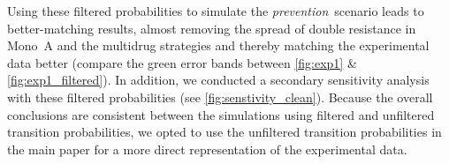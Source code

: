 Using these filtered probabilities to simulate the \textit{prevention}~scenario leads to better-matching results, almost removing the spread of double resistance in Mono~A and the multidrug strategies and thereby matching the experimental data better (compare the green error bands between \autoref{fig:exp1} \& \autoref{fig:exp1_filtered}).
In addition, we conducted a secondary sensitivity analysis with these filtered probabilities (see \autoref{fig:senstivity_clean}).
Because the overall conclusions are consistent between the simulations using filtered and unfiltered transition probabilities, we opted to use the unfiltered transition probabilities in the main paper for a more direct representation of the experimental data.
